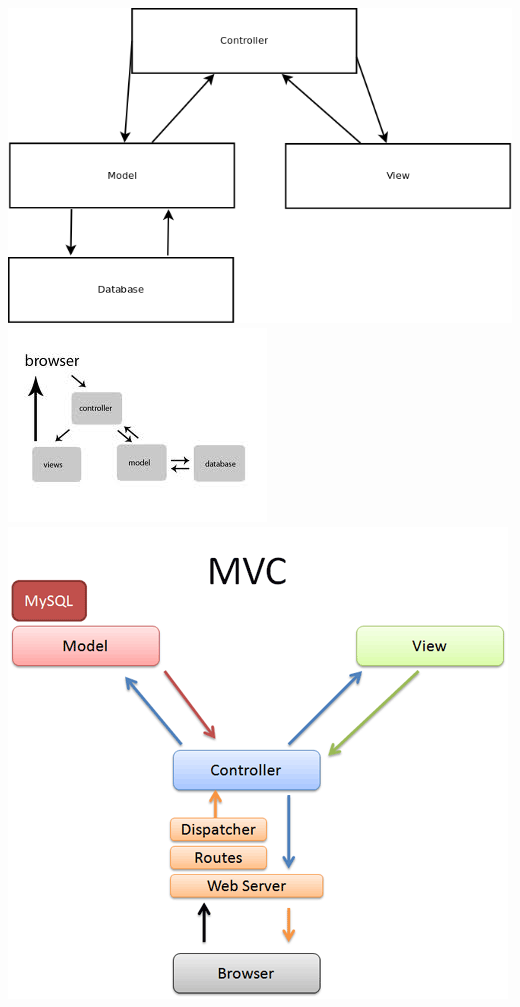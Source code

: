 \documentclass[12pt]{report}
\begin{document}
\includegraphics[scale=0.2]{mvc-diag.png}\\
\includegraphics[scale=1]{MVC-Diagram2.jpeg}\\
\includegraphics[scale=1]{MVC-Diagram3.png}\\
\end{document}
